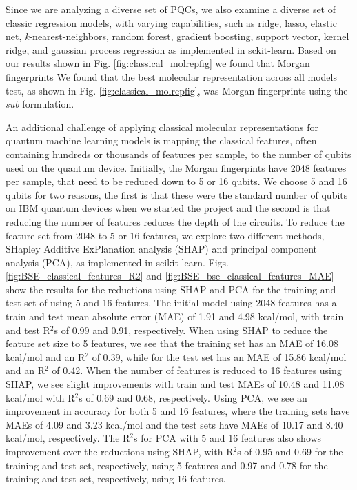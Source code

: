 \documentclass[journal=jacsat,manuscript=article]{achemso}
\begin{document}
Since we are analyzing a diverse set of PQCs, we also examine a diverse set of classic regression models, with varying capabilities, such as ridge, lasso, elastic net, \textit{k}-nearest-neighbors, random forest, gradient boosting, support vector, kernel ridge, and gaussian process regression as implemented in sckit-learn.\cite{pedregosa_scikit-learn_2011}
Based on our results shown in Fig. \ref{fig:classical_molrepfig} we found that Morgan fingerprints
We found that the best molecular representation across all models test, as shown in Fig. \ref{fig:classical_molrepfig}, was Morgan fingerprints using the \textit{sub} formulation.




An additional challenge of applying classical molecular representations for quantum machine learning models is mapping the classical features, often containing hundreds or thousands of features per sample, to the number of qubits used on the quantum device.
Initially, the Morgan fingerpints have 2048 features per sample, that need to be reduced down to 5 or 16 qubits.
We choose 5 and 16 qubits for two reasons, the first is that these were the standard number of qubits on IBM quantum devices when we started the project and the second is that reducing the number of features reduces the depth of the circuits.
To reduce the feature set from 2048 to 5 or 16 features, we explore two different methods, SHapley Additive ExPlanation analysis (SHAP)\cite{lundberg_unified_2017} and principal component analysis (PCA), as implemented in scikit-learn.\cite{pedregosa_scikit-learn_2011}
Figs. \ref{fig:BSE_classical_features_R2} and \ref{fig:BSE_bse_classical_features_MAE} show the results for the reductions using SHAP and PCA for the training and test set of using 5 and 16 features.
The initial model using 2048 features has a train and test mean absolute error (MAE) of 1.91 and 4.98 kcal/mol, with train and test R$^{2}$s of 0.99 and 0.91, respectively.
When using SHAP to reduce the feature set size to 5 features, we see that the training set has an MAE of 16.08 kcal/mol and an R$^{2}$ of 0.39, while for the test set has an MAE of 15.86 kcal/mol and an R$^{2}$ of 0.42.
When the number of features is reduced to 16 features using SHAP, we see slight improvements with train and test MAEs of 10.48 and 11.08 kcal/mol with R$^{2}$s of 0.69 and 0.68, respectively.
Using PCA, we see an improvement in accuracy for both 5 and 16 features, where the training sets have MAEs of 4.09 and 3.23 kcal/mol and the test sets have MAEs of 10.17 and 8.40 kcal/mol, respectively.
The R$^{2}$s for PCA with 5 and 16 features also shows improvement over the reductions using SHAP, with R$^{2}$s of 0.95 and 0.69 for the training and test set, respectively, using 5 features and 0.97 and 0.78 for the training and test set, respectively, using 16 features.
\end{document}
